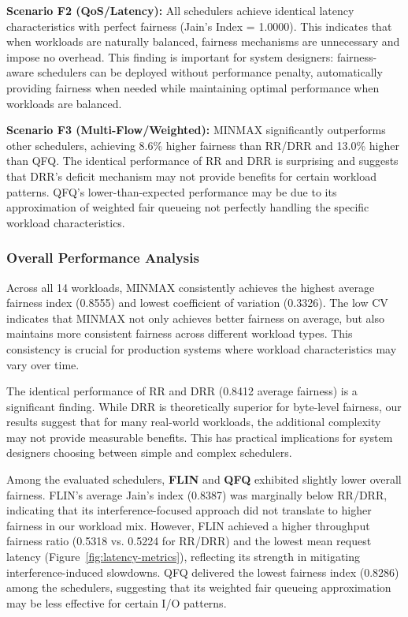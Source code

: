 \documentclass[11pt]{article}
\begin{document}
\textbf{Scenario F2 (QoS/Latency):} All schedulers achieve identical latency characteristics with perfect fairness (Jain's Index = 1.0000). This indicates that when workloads are naturally balanced, fairness mechanisms are unnecessary and impose no overhead. This finding is important for system designers: fairness-aware schedulers can be deployed without performance penalty, automatically providing fairness when needed while maintaining optimal performance when workloads are balanced.

\textbf{Scenario F3 (Multi-Flow/Weighted):} MINMAX significantly outperforms other schedulers, achieving 8.6\% higher fairness than RR/DRR and 13.0\% higher than QFQ. The identical performance of RR and DRR is surprising and suggests that DRR's deficit mechanism may not provide benefits for certain workload patterns. QFQ's lower-than-expected performance may be due to its approximation of weighted fair queueing not perfectly handling the specific workload characteristics.

\subsubsection{Overall Performance Analysis}

Across all 14 workloads, MINMAX consistently achieves the highest average fairness index (0.8555) and lowest coefficient of variation (0.3326). The low CV indicates that MINMAX not only achieves better fairness on average, but also maintains more consistent fairness across different workload types. This consistency is crucial for production systems where workload characteristics may vary over time.

The identical performance of RR and DRR (0.8412 average fairness) is a significant finding. While DRR is theoretically superior for byte-level fairness, our results suggest that for many real-world workloads, the additional complexity may not provide measurable benefits. This has practical implications for system designers choosing between simple and complex schedulers.

Among the evaluated schedulers, \textbf{FLIN} and \textbf{QFQ} exhibited slightly lower overall fairness. FLIN's average Jain's index (0.8387) was marginally below RR/DRR, indicating that its interference-focused approach did not translate to higher fairness in our workload mix. However, FLIN achieved a higher throughput fairness ratio (0.5318 vs. 0.5224 for RR/DRR) and the lowest mean request latency (Figure~\ref{fig:latency-metrics}), reflecting its strength in mitigating interference-induced slowdowns. QFQ delivered the lowest fairness index (0.8286) among the schedulers, suggesting that its weighted fair queueing approximation may be less effective for certain I/O patterns.
\end{document}
